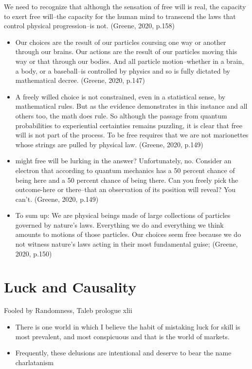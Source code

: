 \documentclass[11pt]{article}
\begin{document}
We need to recognize that although the sensation of free will is real, the capacity to exert free will--the capacity for the human mind to transcend the laws that control physical progression--is not.
(Greene, 2020, p.158)
\begin{itemize}
 \item {Our choices are the result of our particles coursing one way or another through our brains. Our actions are the result of our particles moving this way or that through our bodies. And all particle motion--whether in a brain, a body, or a baseball--is controlled by physics and so is fully dictated by mathematical decree. (Greene, 2020, p.147)
       }
       \item{
                   A freely willed choice is not constrained, even in a statistical sense, by mathematical rules. But as the evidence demonstrates in this instance and all others too, the math does rule. So although the passage from quantum probabilities to experiential certainties remains puzzling, it is clear that free will is not part of the process. To be free requires that we are not marionettes whose strings are pulled by physical law. (Greene, 2020, p.149)
             }
       \item{
                   might free will be lurking in the answer? Unfortunately, no. Consider an electron that according to quantum mechanics has a 50 percent chance of being here and a 50 percent chance of being there. Can you freely pick the outcome-here or there--that an observation of its position will reveal? You can't.
                   (Greene, 2020, p.149)
             }
 \item {
       To sum up: We are physical beings made of large collections of particles governed by nature's laws. Everything we do and everything we think amounts to motions of those particles.
       Our choices seem free because we do not witness nature's laws acting in their most fundamental guise;
       (Greene, 2020, p.150)
       }
\end{itemize}
\section{Luck and Causality}
Fooled by Randomness, Taleb prologue xlii
\begin{itemize}
 \item {
       There is one world in which I believe the habit of mistaking luck for skill is most prevalent, and most conspicuous and that is the world of markets.
       }
 \item {Frequently, these delusions are intentional and deserve to bear the name charlatanism}
\end{itemize}
\end{document}
